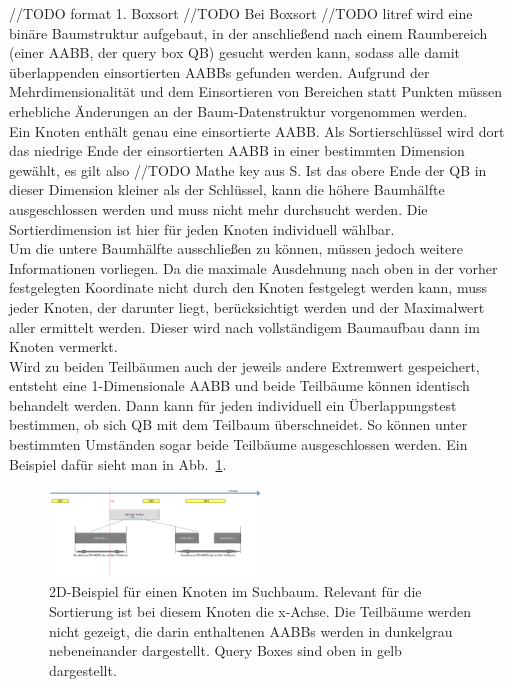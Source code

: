 //TODO format
1. Boxsort
//TODO
Bei Boxsort //TODO litref wird eine binäre Baumstruktur aufgebaut, in der anschließend nach einem Raumbereich (einer AABB, der query box QB) gesucht werden kann, sodass alle damit überlappenden einsortierten AABBs gefunden werden. Aufgrund der Mehrdimensionalität und dem Einsortieren von Bereichen statt Punkten müssen erhebliche Änderungen an der Baum-Datenstruktur vorgenommen werden.\\
Ein Knoten enthält genau eine einsortierte AABB. Als Sortierschlüssel wird dort das niedrige Ende der einsortierten AABB in einer bestimmten Dimension gewählt, es gilt also //TODO Mathe key aus S. Ist das obere Ende der QB in dieser Dimension kleiner als der Schlüssel, kann die höhere Baumhälfte ausgeschlossen werden und muss nicht mehr durchsucht werden. Die Sortierdimension ist hier für jeden Knoten individuell wählbar.\\
Um die untere Baumhälfte ausschließen zu können, müssen jedoch weitere Informationen vorliegen. Da die maximale Ausdehnung nach oben in der vorher festgelegten Koordinate nicht durch den Knoten festgelegt werden kann, muss jeder Knoten, der darunter liegt, berücksichtigt werden und der Maximalwert aller ermittelt werden. Dieser wird nach vollständigem Baumaufbau dann im Knoten vermerkt.\\
Wird zu beiden Teilbäumen auch der jeweils andere Extremwert gespeichert, entsteht eine 1-Dimensionale AABB und beide Teilbäume können identisch behandelt werden. Dann kann für jeden individuell ein Überlappungstest bestimmen, ob sich QB mit dem Teilbaum überschneidet. So können unter bestimmten Umständen sogar beide Teilbäume ausgeschlossen werden. Ein Beispiel dafür sieht man in Abb.~\ref{fig:boxsortNode}.\\

\begin{figure}
    \centering
    \includegraphics[width=0.5\textwidth]{./res/BoxsortNode.png}
    \caption{2D-Beispiel für einen Knoten im Suchbaum. Relevant für die Sortierung ist bei diesem Knoten die x-Achse. Die Teilbäume werden nicht gezeigt, die darin enthaltenen AABBs werden in dunkelgrau nebeneinander dargestellt. Query Boxes sind oben in gelb dargestellt.}
    \label{fig:boxsortNode}
\end{figure}


